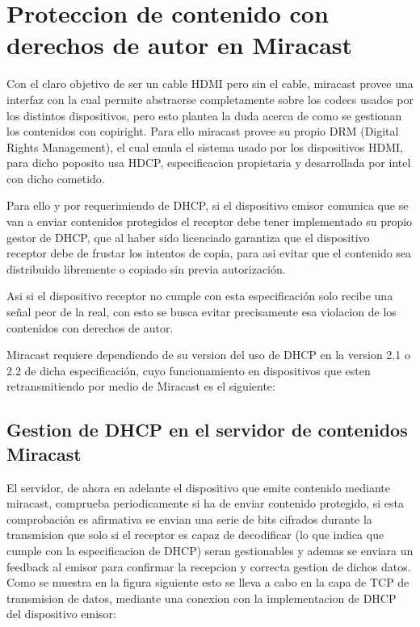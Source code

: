 \section{Proteccion de contenido con derechos de autor en Miracast}

Con el claro objetivo de ser un cable HDMI pero sin el cable, miracast provee una interfaz con la cual permite abstraerse completamente sobre los codecs usados por los distintos dispositivos, pero esto plantea la duda acerca de como se gestionan los contenidos con copiright. Para ello miracast provee su propio DRM (Digital Rights Management), el cual emula el sistema usado por los dispositivos HDMI, para dicho poposito usa HDCP, especificacion propietaria y desarrollada por intel con dicho cometido.

Para ello y por requerimiendo de DHCP, si el dispositivo emisor comunica que se van a enviar contenidos protegidos el receptor debe tener implementado su propio gestor de DHCP, que al haber sido licenciado garantiza que el dispositivo receptor debe de frustar los intentos de copia, para asi evitar que el contenido sea distribuido libremente o copiado sin previa autorización.

Asi si el dispositivo receptor no cumple con esta especificación solo recibe una señal peor de la real, con esto se busca evitar precisamente esa violacion de los contenidos con derechos de autor.

Miracast requiere dependiendo de su version del uso de DHCP en la version 2.1 o 2.2 de dicha especificación, cuyo funcionamiento en dispositivos que esten retransmitiendo por medio de Miracast es el siguiente:

\subsection{Gestion de DHCP en el servidor de contenidos Miracast}

El servidor, de ahora en adelante el dispositivo que emite contenido mediante miracast, comprueba periodicamente si ha de enviar contenido protegido, si esta comprobación es afirmativa se envian una serie de bits cifrados durante la transmision que solo si el receptor es capaz de decodificar (lo que indica que cumple con la especificacion de DHCP) seran gestionables y ademas se enviara un feedback al emisor para confirmar la recepcion y correcta gestion de dichos datos. Como se muestra en la figura siguiente esto se lleva a cabo en la capa de TCP de transmision de datos, mediante una conexion con la implementacion de DHCP del dispositivo emisor:


